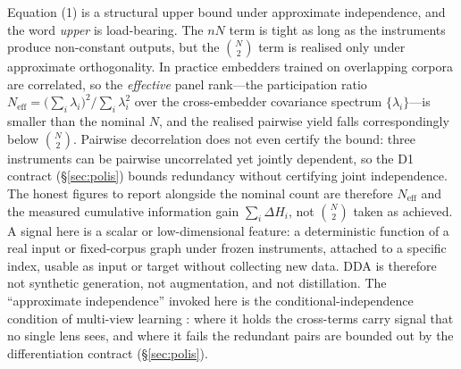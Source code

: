 \documentclass[10pt,twocolumn]{article}
\begin{document}
Equation (1) is a structural upper bound under approximate independence, and the
word \emph{upper} is load-bearing. The $nN$ term is tight as long as the
instruments produce non-constant outputs, but the $\binom{N}{2}$ term is realised
only under approximate orthogonality. In practice embedders trained on overlapping
corpora are correlated, so the \emph{effective} panel rank---the participation
ratio $N_{\mathrm{eff}}=\bigl(\sum_i\lambda_i\bigr)^2/\sum_i\lambda_i^2$ over the
cross-embedder covariance spectrum $\{\lambda_i\}$---is smaller than the nominal
$N$, and the realised pairwise yield falls correspondingly below $\binom{N}{2}$.
Pairwise decorrelation does not even certify the bound: three instruments can be
pairwise uncorrelated yet jointly dependent, so the D1 contract
(\S\ref{sec:polis}) bounds redundancy without certifying joint independence. The
honest figures to report alongside the nominal count are therefore
$N_{\mathrm{eff}}$ and the measured cumulative information gain
$\sum_i\Delta H_i$, not $\binom{N}{2}$ taken as achieved. A signal here is a
scalar or low-dimensional feature: a deterministic function of a real input or
fixed-corpus graph under frozen instruments, attached to a specific index, usable
as input or target without collecting new data. DDA is therefore not synthetic
generation, not augmentation, and not distillation. The
``approximate independence'' invoked here is the conditional-independence
condition of multi-view learning \citep{blum1998cotraining}: where it holds the
cross-terms carry signal that no single lens sees, and where it fails the
redundant pairs are bounded out by the differentiation contract
(\S\ref{sec:polis}).
\end{document}
